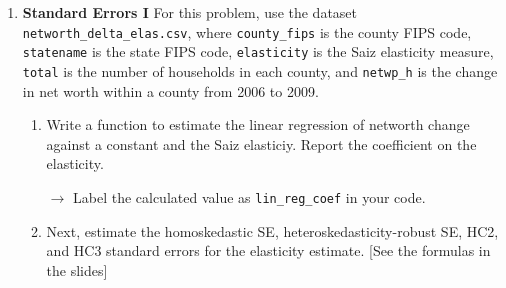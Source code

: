 \documentclass[11pt, a4paper]{article}
\begin{document}
\begin{enumerate}
\item \textbf{Standard Errors I} For this problem, use the dataset \texttt{networth\_delta\_elas.csv}, where \texttt{county\_fips} is the county FIPS code, \texttt{statename} is the state FIPS code, \texttt{elasticity} is the Saiz elasticity measure, \texttt{total} is the number of households in each county, and \texttt{netwp\_h} is the change in net worth within a county from 2006 to 2009.
\begin{enumerate}
\item Write a function to estimate the linear regression of networth change against a constant and the Saiz elasticiy. Report the coefficient on the elasticity. 

\hspace{10pt} $\rightarrow$ Label the calculated value as \texttt{lin\_reg\_coef} in your code.
\item Next, estimate the homoskedastic SE, heteroskedasticity-robust SE, HC2, and HC3 standard errors for the elasticity estimate. [See the formulas in the slides]


\end{enumerate}
\end{enumerate}
\end{document}
